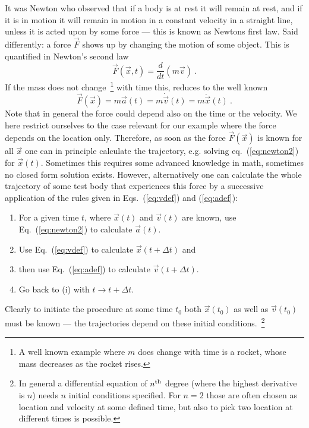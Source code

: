 \documentclass[12pt]{iopart}
\begin{document}
It was Newton who observed that if a body is at rest it will remain at rest, and if it is in motion it will remain in motion in a 
constant velocity in a straight line, unless it is acted upon by some force --- this is known as Newtons first law. 
Said differently: a force $\vec F$ shows up by changing the motion of some object. This is quantified in Newton's second law
\begin{equation}
\vec F(\vec x, t) = \frac{d}{dt}(m \vec v) \ .
\end{equation} 
If the mass does not change~\footnote{A well known example where $m$ does change with time is a 
rocket, whose mass decreases as the rocket rises.} with time this, reduces to the well known
\begin{equation}
\vec F(\vec x) = m \vec a(t) = m\dot{\vec v}(t) = m\ddot{\vec{x}}(t) \ . \label{eq:newton2}
\end{equation} 
Note that in general the force could depend also on the time or the velocity. We here restrict ourselves to the
case relevant for our example where the force depends on the location only. 
Therefore, 
as soon as the force $\vec F(\vec x)$ is known for all $\vec x$ one can in principle calculate the trajectory, e.g. solving eq.~(\ref{eq:newton2})
for $\vec x(t)$.
Sometimes this requires some advanced knowledge in math, sometimes no closed form solution exists. However, alternatively 
one can calculate the whole trajectory
of some test body that experiences this force by a successive application of the rules 
given in Eqs.~(\ref{eq:vdef}) and (\ref{eq:adef}):
%
%
\begin{enumerate}
\item For a given time $t$, where $\vec x(t)$ and $\vec v(t)$ are known, use Eq.~(\ref{eq:newton2}) to calculate $\vec a(t)$.
\item Use Eq.~(\ref{eq:vdef}) to calculate $\vec x(t+\Delta t)$ and
\item then use Eq.~(\ref{eq:adef}) to calculate $\vec v(t+\Delta t)$.
\item Go back to (i) with $t\to t+\Delta t$.
\end{enumerate}
Clearly to initiate the procedure at some time $t_0$ both $\vec x(t_0)$ as well as $\vec v(t_0)$ must be known --- the 
trajectories depend on these initial conditions.~\footnote{In general a differential equation of $n^{\rm th}$ degree (where
the highest derivative is $n$) needs $n$ initial conditions specified. For $n=2$ those are often chosen as location and velocity
at some defined time, but also to pick two location at different times is possible. }
\end{document}
